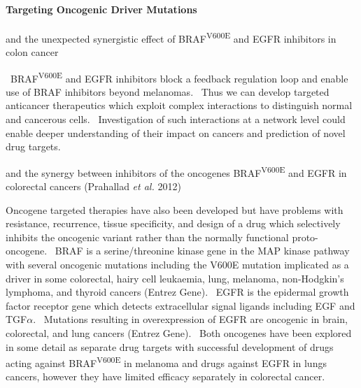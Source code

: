 \paragraph{Targeting Oncogenic Driver Mutations}

and the unexpected synergistic effect of BRAF\textsuperscript{V600E} and EGFR inhibitors in colon cancer

\ BRAF\textsuperscript{V600E} and EGFR inhibitors block a feedback regulation loop and enable use of BRAF inhibitors beyond melanomas. \ Thus we can develop targeted anticancer therapeutics which exploit complex interactions to distinguish normal and cancerous cells. \ Investigation of such interactions at a network level could enable deeper understanding of their impact on cancers and prediction of novel drug targets.

and the synergy between inhibitors of the oncogenes BRAF\textsuperscript{V600E} and EGFR in colorectal cancers (Prahallad\textit{ et al.} 2012)

Oncogene targeted therapies have also been developed but have problems with resistance, recurrence, tissue specificity, and design of a drug which selectively inhibits the oncogenic variant rather than the normally functional proto-oncogene. \ BRAF is a serine/threonine kinase gene in the MAP kinase pathway with several oncogenic mutations including the V600E mutation implicated as a driver in some colorectal, hairy cell leukaemia, lung, melanoma, non-Hodgkin{\textquoteright}s lymphoma, and thyroid cancers (Entrez Gene). \ EGFR is the epidermal growth factor receptor gene which detects extracellular signal ligands including EGF and TGF$\alpha $. \ Mutations resulting in overexpression of EGFR are oncogenic in brain, colorectal, and lung cancers (Entrez Gene). \ Both oncogenes have been explored in some detail as separate drug targets with successful development of drugs acting against BRAF\textsuperscript{V600E} in melanoma and drugs against EGFR in lungs cancers, however they have limited efficacy separately in colorectal cancer. \  


